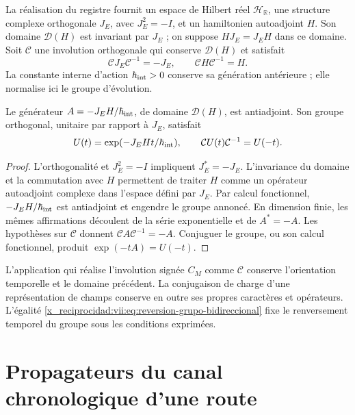 La réalisation du registre fournit un espace de Hilbert réel \(\mathcal H_{\mathbb R}\), une structure complexe orthogonale \(J_E\), avec \(J_E^2=-I\), et un hamiltonien autoadjoint \(H\). Son domaine \(\mathcal D(H)\) est invariant par \(J_E\) ; on suppose \(HJ_E=J_EH\) dans ce domaine. Soit \(\mathcal C\) une involution orthogonale qui conserve \(\mathcal D(H)\) et satisfait
\begin{equation}
 \mathcal C J_E\mathcal C^{-1}=-J_E,\qquad
 \mathcal C H\mathcal C^{-1}=H.
 \label{x_reciprocidad:vii:eq:dominio-reversion-evolucion}
\end{equation}
La constante interne d'action \(\hbar_{\rm int}>0\) conserve sa
génération antérieure ; elle normalise ici le groupe d'évolution.

\begin{theorem}
\label{x_reciprocidad:vii:thm:reversion-evolucion}
Le générateur \(A=-J_EH/\hbar_{\rm int}\), de domaine \(\mathcal D(H)\),
est antiadjoint. Son groupe orthogonal, unitaire par rapport à \(J_E\), satisfait
\begin{equation}
 U(t)=\exp(-J_EHt/\hbar_{\rm int}),\qquad
 \mathcal C U(t)\mathcal C^{-1}=U(-t).
 \label{x_reciprocidad:vii:eq:reversion-grupo-bidireccional}
\end{equation}
\end{theorem}
\begin{proof}
L'orthogonalité et \(J_E^2=-I\) impliquent \(J_E^*=-J_E\).
L'invariance du domaine et la commutation avec \(H\) permettent de traiter
\(H\) comme un opérateur autoadjoint complexe dans l'espace défini par
\(J_E\). Par calcul fonctionnel, \(-J_EH/\hbar_{\rm int}\) est
antiadjoint et engendre le groupe annoncé. En dimension finie, les mêmes
affirmations découlent de la série exponentielle et de \(A^*=-A\).
Les hypothèses sur \(\mathcal C\) donnent
\(\mathcal C A\mathcal C^{-1}=-A\). Conjuguer le groupe, ou son calcul
fonctionnel, produit \(\exp(-tA)=U(-t)\).
\end{proof}

L'application qui réalise l'involution signée \(C_M\) comme \(\mathcal C\)
conserve l'orientation temporelle et le domaine précédent. La conjugaison de
charge d'une représentation de champs conserve en outre ses propres
caractères et opérateurs. L'égalité
\eqref{x_reciprocidad:vii:eq:reversion-grupo-bidireccional} fixe le renversement temporel
du groupe sous les conditions exprimées.

\section{Propagateurs du canal chronologique d'une route}
\label{x_reciprocidad:vii:subsec:green-cronologico}

